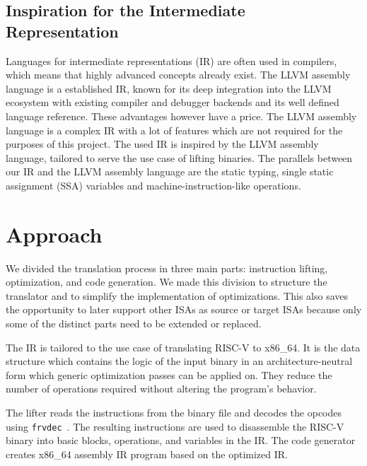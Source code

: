 \documentclass[course=eragp]{aspdoc}
\begin{document}
\subsection{Inspiration for the Intermediate Representation}

Languages for intermediate representations (IR) are often used in compilers, which means that highly
advanced concepts already exist. The LLVM assembly language is a established IR, known for its deep
integration into the LLVM ecosystem with existing compiler and debugger backends and its well
defined language reference. These advantages however have a price. The LLVM assembly language is a
complex IR with a lot of features which are not required for the purposes of this project. The used IR
is inspired by the LLVM assembly language, tailored to serve the use case of lifting binaries. The
parallels between our IR and the LLVM assembly language are the static
typing, single static assignment (SSA) variables and machine-instruction-like operations.

\section{Approach}\label{sec:approach}

We divided the translation process in three main parts: instruction lifting, optimization, and code
generation. We made this division to structure the translator and to simplify the implementation of
optimizations. This also saves the opportunity to later support other ISAs as source or target ISAs
because only some of the distinct parts need to be extended or replaced.

\par

The IR is tailored to the use case of translating RISC-V to x86\_64. It is the data structure which
contains the logic of the input binary in an architecture-neutral form which generic optimization
passes can be applied on. They reduce the number of operations required without altering the
program's behavior.

\par

The lifter reads the instructions from the binary file and decodes the opcodes using
\texttt{frvdec}~\cite{frvdec}. The resulting instructions are used to disassemble the RISC-V binary
into basic blocks, operations, and variables in the IR. The code generator creates x86\_64
assembly IR program based on the optimized IR.
\end{document}
